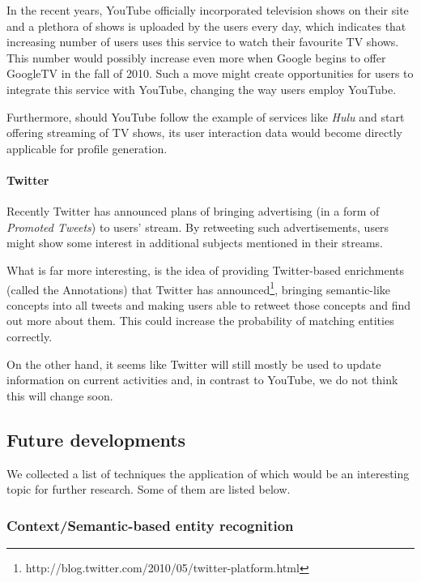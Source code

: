 In the recent years, YouTube officially incorporated television shows on their
site \cite{youtube-tv-shows} and a plethora of shows is uploaded by the users
every day, which indicates that increasing number of users uses this service to
watch their favourite TV shows. This number would possibly increase even more
when Google begins to offer GoogleTV in the
fall of 2010. Such a move might create opportunities for users to integrate
this service with YouTube, changing the way users employ YouTube.

Furthermore, should YouTube follow the example of services like \textit{Hulu}
and start offering streaming of TV shows, its user interaction data would become
directly applicable for profile generation.

\paragraph{Twitter}

Recently Twitter has announced plans of bringing advertising (\eg in a form of
\textit{Promoted Tweets}) to users' stream.  By retweeting such advertisements,
users might show some interest in additional subjects mentioned in their
streams.

What is far more interesting, is the idea of providing Twitter-based
enrichments (called the Annotations) that Twitter has announced\footnote{http://blog.twitter.com/2010/05/twitter-platform.html},
bringing semantic-like concepts into all tweets and making users able to
retweet those concepts and find out more about them. This could increase
the probability of matching entities correctly.

On the other hand, it seems like Twitter will still mostly be used to update
information on current activities and, in contrast to YouTube, we do not think
this will change soon.

\subsection{Future developments}

We collected a list of techniques the application of which would be an
interesting topic for further research. Some of them are listed below.

\subsubsection{Context/Semantic-based entity recognition}

